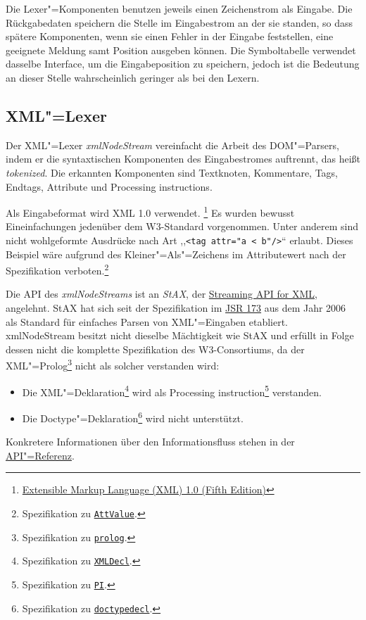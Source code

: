 \documentclass[10pt,a4paper,ngerman,titlepage,tocindentauto]{scrartcl}
\newcommand{\xmlNote}[2]{\footnote{Spezifikation zu \href{http://www.w3.org/TR/2008/REC-xml-20081126/\#{#1}}{\texttt{#2}}.}}
\begin{document}
		Die Lexer"=Komponenten benutzen jeweils einen Zeichenstrom als Eingabe. Die Rückgabedaten speichern die
		Stelle im Eingabestrom an der sie standen, so dass spätere Komponenten, wenn sie einen Fehler
		in der Eingabe feststellen, eine geeignete Meldung samt Position ausgeben können.
		Die Symboltabelle verwendet dasselbe Interface, um die Eingabeposition zu speichern, jedoch ist
		die Bedeutung an dieser Stelle wahrscheinlich geringer als bei den Lexern.
		
		\subsection[XML"=Lexer]{\hypertarget{Teilprojekte_XML_Lexer}{XML"=Lexer}}
			Der XML"=Lexer {\em xmlNodeStream} vereinfacht die Arbeit des DOM"=Parsers, indem er die syntaxtischen
			Komponenten des Eingabestromes auftrennt, das heißt {\em tokenized}.
			Die erkannten Komponenten sind Textknoten, Kommentare, Tags, Endtags, Attribute und Processing instructions.
			
			Als Eingabeformat wird XML 1.0 verwendet.%
			\footnote{\href{http://www.w3.org/TR/2008/REC-xml-20081126/}{Extensible Markup Language (XML) 1.0 (Fifth Edition)}}
			Es wurden bewusst Eineinfachungen jedenüber dem W3-Standard vorgenommen. Unter anderem sind
			nicht wohlgeformte Ausdrücke nach Art ,,\verb|<tag attr="a < b"/>|`` erlaubt.
			Dieses Beispiel wäre aufgrund des Kleiner"=Als"=Zeichens im Attributewert
			nach der Spezifikation verboten.\xmlNote{NT-AttValue}{AttValue}
			
			Die API des {\em xmlNodeStreams} ist an {\em StAX}, der \href{http://stax.codehaus.org/}{Streaming API for XML},
			angelehnt. StAX hat sich seit der Spezifikation im \href{http://jcp.org/en/jsr/detail?id=173}{JSR 173} aus
			dem Jahr 2006 als Standard für einfaches Parsen von XML"=Eingaben etabliert.
			xmlNodeStream besitzt nicht dieselbe Mächtigkeit wie StAX und erfüllt in Folge dessen
			nicht die komplette Spezifikation des W3-Consortiums, da der XML"=Prolog\xmlNote{xmldoc}{prolog}
			nicht als solcher verstanden wird:
			\begin{itemize}
				\item
					Die XML"=Deklaration\xmlNote{NT-XMLDecl}{XMLDecl} wird als
					Processing instruction\xmlNote{NT-PI}{PI} verstanden.
				\item
					Die Doctype"=Deklaration\xmlNote{NT-doctypedecl}{doctypedecl} wird nicht unterstützt.
			\end{itemize}
			Konkretere Informationen über den Informationsfluss stehen in der \hyperlink{XML-Lexer-API}{API"=Referenz}.
			
\end{document}
